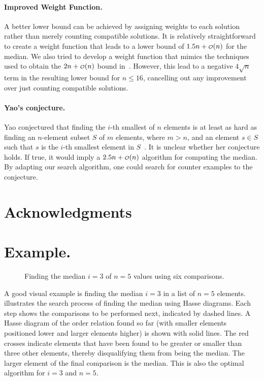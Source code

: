 \documentclass[twoside,leqno,twocolumn]{article}
\newcommand\smallO{
\mathchoice
{{\scriptstyle\mathcal{O}}}%
{{\scriptstyle\mathcal{O}}}%
{{\scriptscriptstyle\mathcal{O}}}%
{\scalebox{.50}{$\scriptscriptstyle\mathcal{O}$}}%
}
\begin{document}
\paragraph{Improved Weight Function.}
A better lower bound can be achieved by assigning weights to each solution rather than merely counting compatible solutions.
It is relatively straightforward to create a weight function that leads to a lower bound of $1.5n + \smallO(n)$ for the median.
We also tried to develop a weight function that mimics the techniques used to obtain the $2n + \smallO(n)$ bound in~\cite{bent1985finding}.
However, this lead to a negative $4\sqrt{n}$ term in the resulting lower bound for $n \leq 16$, cancelling out any improvement over just counting compatible solutions.

\paragraph{Yao's conjecture.}
Yao conjectured that finding the $i$-th smallest of $n$ elements is at least as hard as finding an $n$-element subset $S$ of $m$ elements, where $m > n$, and an element $s \in S$ such that $s$ is the $i$-th smallest element in $S$~\cite{yao1974lower}.
It is unclear whether her conjecture holds.
If true, it would imply a $2.5n + \smallO(n)$ algorithm for computing the median.
By adapting our search algorithm, one could search for counter examples to the conjecture.



\section*{Acknowledgments}




\clearpage
\appendix


\section{Example.}
\begin{figure}[!b]
  \centering
  
  \caption{Finding the median $i = 3$ of $n = 5$ values using six comparisons.}
  \label{fig:median_of_5}
\end{figure}

A good visual example is finding the median $i = 3$ in a list of $n = 5$ elements.
 illustrates the search process of finding the median using Hasse diagrams.
Each step shows the comparisons to be performed next, indicated by dashed lines.
A Hasse diagram of the order relation found so far (with smaller elements positioned lower and larger elements higher) is shown with solid lines.
The red crosses indicate elements that have been found to be greater or smaller than three other elements, thereby disqualifying them from being the median.
The larger element of the final comparison is the median.
This is also the optimal algorithm for $i = 3$ and $n = 5$.
\end{document}
